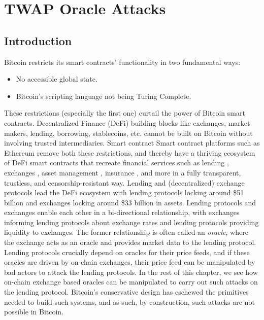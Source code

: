 \chapter{TWAP Oracle Attacks}  %
\label{chapter:oracles}

\section{Introduction}
Bitcoin restricts its smart contracts' functionality in two fundamental ways:
\begin{itemize}
\item No accessible global state.
\item Bitcoin's scripting language not being Turing Complete.
\end{itemize}
These restrictions (especially the first one) curtail the power of Bitcoin smart contracts. Decentralized Finance (DeFi) building blocks like exchanges, market makers, lending, borrowing, stablecoins, etc. cannot be built on Bitcoin without involving trusted intermediaries. Smart contract Smart contract platforms such as Ethereum \cite{wood2014ethereum} remove both these restrictions, and thereby have a thriving ecosystem of DeFi smart contracts that recreate financial services such as lending \cite{leshner2019compound,AaveWhitepaper}, exchanges \cite{Zhang2018UniV1,warren20170x}, asset management \cite{yearn_finance,convex_finance}, insurance \cite{KarpNexusMutual}, and more in a fully transparent, trustless, and censorship-resistant way. Lending and (decentralized) exchange protocols lead the DeFi ecosystem with lending protocols locking around \$51 billion and exchanges locking around \$33 billion in assets. Lending protocols and exchanges enable each other in a bi-directional relationship, with exchanges informing lending protocols about exchange rates and lending protocols providing liquidity to exchanges. The former relationship is often called an \textit{oracle}, where the exchange acts as an oracle and provides market data to the lending protocol. Lending protocols crucially depend on oracles for their price feeds, and if these oracles are driven by on-chain exchanges, their price feed can be manipulated by bad actors to attack the lending protocols. In the rest of this chapter, we see how on-chain exchange based oracles can be manipulated to carry out such attacks on the lending protocol. Bitcoin's conservative design has eschewed the primitives needed to build such systems, and as such, by construction, such attacks are not possible in Bitcoin.

